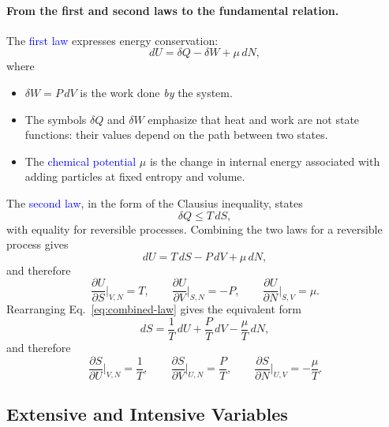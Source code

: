 \paragraph{From the first and second laws to the fundamental relation.}
The \textcolor{blue}{first law} expresses energy conservation:
\begin{equation}
    \boxed{dU = \delta Q-\delta W+\mu\, dN,}
\end{equation}
where
\begin{itemize}
    \item $\delta W=P\,dV$ is the work done \emph{by} the system.
    \item The symbols $\delta Q$ and $\delta W$ emphasize that heat and work
    are not state functions: their values depend on the path between two
    states.
    \item The \textcolor{blue}{chemical potential} $\mu$ is the change in
    internal energy associated with adding particles at fixed entropy and
    volume.
\end{itemize}
The \textcolor{blue}{second law}, in the form of the Clausius inequality,
states
\begin{equation}
    \boxed{\delta Q\leq T\,dS,}
\end{equation}
with equality for reversible processes. Combining the two laws for a
reversible process gives
\begin{equation}
    \boxed{dU=T\,dS-P\,dV+\mu\, dN,}
    \label{eq:combined-law}
\end{equation}
and therefore
\begin{equation}
    \boxed{
    \frac{\partial U}{\partial S}\bigg|_{V,N}=T, \qquad
    \frac{\partial U}{\partial V}\bigg|_{S,N}=-P, \qquad
    \frac{\partial U}{\partial N}\bigg|_{S,V}=\mu.}
    \label{eq:U-derivs}
\end{equation}
Rearranging Eq.~\eqref{eq:combined-law} gives the equivalent form
\begin{equation}
    \boxed{dS=\frac{1}{T}\,dU+\frac{P}{T}\,dV-\frac{\mu}{T}\,dN,}
\end{equation}
and therefore
\begin{equation}
    \boxed{
    \frac{\partial S}{\partial U}\bigg|_{V,N}=\frac{1}{T}, \qquad
    \frac{\partial S}{\partial V}\bigg|_{U,N}=\frac{P}{T}, \qquad
    \frac{\partial S}{\partial N}\bigg|_{U,V}=-\frac{\mu}{T}.}
    \label{eq:S-derivs}
\end{equation}

\subsection{Extensive and Intensive Variables}

